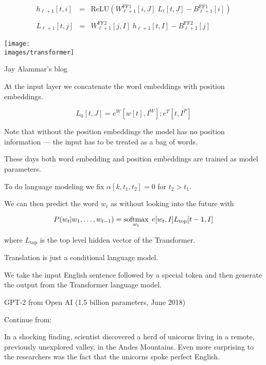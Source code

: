 {\vfill

\begin{eqnarray*}
h_{\ell+1}[t,i] & = & \mathrm{ReLU}(W^{\mathrm{FF1}}_{\ell+1}[i,J]\;L_\ell[t,J] - B^{\mathrm{FF1}}_{\ell+1}[i]) \\
\\
L_{\ell+1}[t,j] & = & W^{\mathrm{FF2}}_{\ell+1}[j,I]\;h_{\ell+1}[t,I] - B^\mathrm{FF2}_{\ell+1}[j]
\end{eqnarray*}


\centerline{\texttt{[image: \\images/transformer]}}

{\huge
\centerline{Jay Alammar's blog}
}


At the input layer we concatenate the word embeddings with position embeddings.

\vfill
{\color{red} $$L_0[t,J] = e^W[w[t],I^W];e^T[t,I^P]$$}

\vfill
Note that without the position embeddings the model has no position information --- the input has to be treated as a bag of words.

\vfill
These days both word embedding and position embeddings are trained as model parameters.


To do language modeling we fix $\alpha[k,t_1,t_2] = 0$ for $t_2 > t_1$.

\vfill
We can then predict the word $w_t$ as without looking into the future with

\vfill
$$P(w_t|w_1,\ldots,w_{t-1}) = \operatorname*{softmax}_{w_t}\;e[w_t,I]L_\mathrm{top}[t-1,I]$$

\vfill
where $L_\mathrm{top}$ is the top level hidden vector of the Transformer.


Translation is just a conditional language model.

\vfill
We take the input English sentence followed by a special token and then generate the output from the Transformer  language model.



GPT-2 from Open AI (1.5 billion parameters, June 2018)

\vfill
{\color{red} Continue from:}

\vfill
In a shocking finding, scientist discovered a herd of unicorns living in a remote, previously unexplored valley, in the Andes Mountains. Even more surprising to the researchers was the fact that the unicorns spoke perfect English.

}
